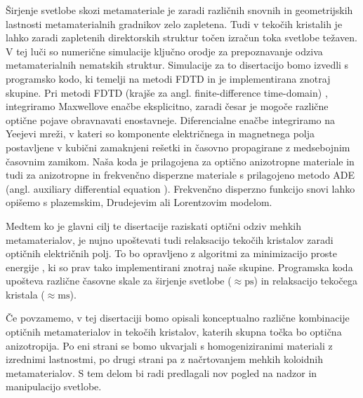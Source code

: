 \documentclass[a4paper,11pt]{article}
\begin{document}

Širjenje svetlobe skozi metamateriale je zaradi različnih snovnih in geometrijskih lastnosti metamaterialnih gradnikov zelo zapletena. 
Tudi v tekočih kristalih je lahko zaradi zapletenih direktorskih struktur točen izračun toka svetlobe težaven. 
V tej luči so numerične simulacije ključno orodje za prepoznavanje odziva metamaterialnih nematskih struktur. 
Simulacije za to disertacijo bomo izvedli s programsko kodo, ki temelji na metodi FDTD in je implementirana znotraj skupine. 
Pri metodi FDTD (krajše za angl. finite-difference time-domain) \cite{taflove1}, integriramo Maxwellove enačbe eksplicitno, zaradi česar je mogoče različne optične pojave obravnavati enostavneje. 
Diferencialne enačbe integriramo na Yeejevi mreži, v kateri so komponente električnega in magnetnega polja postavljene v kubični zamaknjeni rešetki in časovno propagirane z medsebojnim časovnim zamikom. 
Naša koda je prilagojena za optično anizotropne materiale in tudi za anizotropne in frekvenčno disperzne materiale s prilagojeno metodo ADE (angl. auxiliary differential equation \cite{taflove1}). 
Frekvenčno disperzno funkcijo snovi lahko opišemo s plazemskim, Drudejevim ali Lorentzovim modelom. 

Medtem ko je glavni cilj te disertacije raziskati optični odziv mehkih metamaterialov, je nujno upoštevati tudi relaksacijo tekočih kristalov zaradi optičnih električnih polj. 
To bo opravljeno z algoritmi za minimizacijo proste energije \cite{ravnik-2009-lc-modelling}, ki so prav tako implementirani znotraj naše skupine. 
Programska koda upošteva različne časovne skale za širjenje svetlobe ($\approx \mathrm{ps}$) in relaksacijo tekočega kristala ($\approx \mathrm{ms}$). 

Če povzamemo, v tej disertaciji bomo opisali konceptualno različne kombinacije optičnih metamaterialov in tekočih kristalov, katerih skupna točka bo optična anizotropija. 
Po eni strani se bomo ukvarjali s homogeniziranimi materiali z izrednimi lastnostmi, po drugi strani pa z načrtovanjem mehkih koloidnih metamaterialov. 
S tem delom bi radi predlagali nov pogled na nadzor in manipulacijo svetlobe. 



\end{document}
